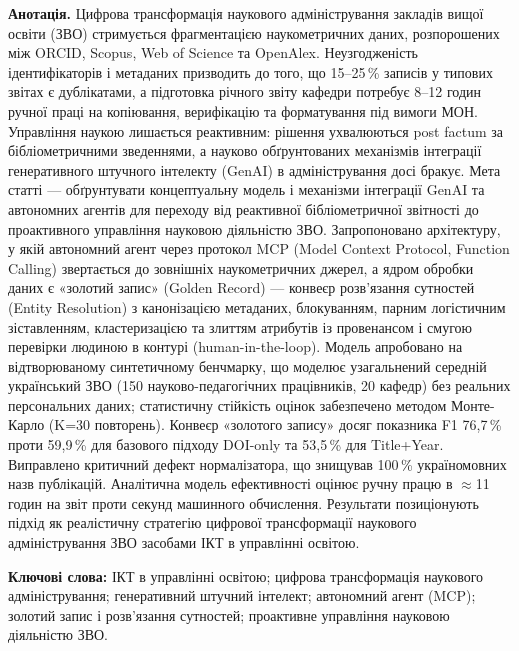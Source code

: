 \textbf{Анотація.} Цифрова трансформація наукового адміністрування закладів вищої освіти (ЗВО) стримується фрагментацією наукометричних даних, розпорошених між ORCID, Scopus, Web of Science та OpenAlex. Неузгодженість ідентифікаторів і метаданих призводить до того, що 15--25\,\% записів у типових звітах є дублікатами, а підготовка річного звіту кафедри потребує 8--12 годин ручної праці на копіювання, верифікацію та форматування під вимоги МОН. Управління наукою лишається реактивним: рішення ухвалюються post factum за бібліометричними зведеннями, а науково обґрунтованих механізмів інтеграції генеративного штучного інтелекту (GenAI) в адміністрування досі бракує. Мета статті --- обґрунтувати концептуальну модель і механізми інтеграції GenAI та автономних агентів для переходу від реактивної бібліометричної звітності до проактивного управління науковою діяльністю ЗВО. Запропоновано архітектуру, у якій автономний агент через протокол MCP (Model Context Protocol, Function Calling) звертається до зовнішніх наукометричних джерел, а ядром обробки даних є «золотий запис» (Golden Record) --- конвеєр розв'язання сутностей (Entity Resolution) з канонізацією метаданих, блокуванням, парним логістичним зіставленням, кластеризацією та злиттям атрибутів із провенансом і смугою перевірки людиною в контурі (human-in-the-loop). Модель апробовано на відтворюваному синтетичному бенчмарку, що моделює узагальнений середній український ЗВО (150 науково-педагогічних працівників, 20 кафедр) без реальних персональних даних; статистичну стійкість оцінок забезпечено методом Монте-Карло (K=30 повторень). Конвеєр «золотого запису» досяг показника F1 76,7\,\% проти 59,9\,\% для базового підходу DOI-only та 53,5\,\% для Title+Year. Виправлено критичний дефект нормалізатора, що знищував 100\,\% україномовних назв публікацій. Аналітична модель ефективності оцінює ручну працю в $\approx$11 годин на звіт проти секунд машинного обчислення. Результати позиціонують підхід як реалістичну стратегію цифрової трансформації наукового адміністрування ЗВО засобами ІКТ в управлінні освітою.

\textbf{Ключові слова:} ІКТ в управлінні освітою; цифрова трансформація наукового адміністрування; генеративний штучний інтелект; автономний агент (MCP); золотий запис і розв'язання сутностей; проактивне управління науковою діяльністю ЗВО.

\bigskip

